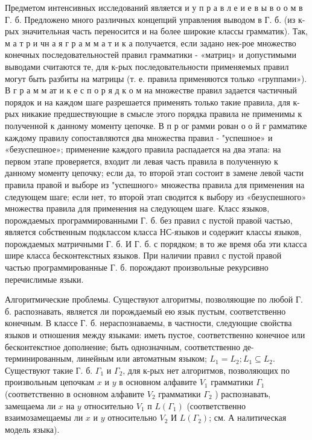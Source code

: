 \documentclass[10pt]{article}
\begin{document}
Предметом интенсивных исследований является и у п р а в л е и е в ы в о о м в Г. б. Предложено много различных концепций управления выводом в Г. б. (из к-рых значительная часть переносится и на более широкие классы грамматик). Так, м а т р и чн а я г р а м м а т и к а получается, если задано нек-рое множество конечных последовательностей правил грамматики - «матриц» и допустимыми выводами считаются те, для к-рых последовательности применяемых правил могут быть разбиты на матрицы (т. е. правила применяются только «группами»). В г р а м м ат и к е с п о р я д к о м на множестве правил задается частичный порядок и на каждом шаге разрешается применять только такие правила, для к-рых никакие предшествующие в смысле этого порядка правила не применимы к полученной к данному моменту цепочке. В п р ог рамми рован о о й г рамматике каждому правилу сопоставляются два множества правил - "успешное» и «безуспешное»; применение каждого правила распадается на два этапа: на первом этапе проверяется, входит ли левая часть правила в полученную к данному моменту цепочку; если да, то второй этап состоит в замене левой части правила правой и выборе из "успешного» множества правила для применения на следующем шаге; если нет, то второй этап сводится к выбору из «безуспешного» множества правила для применения на следующем шаге. Класс языков, порождаемых программированными Г. б. без правил с пустой правой частью, является собственным подклассом класса НС-языков и содержит классы языков, порождаемых матричными Г. б. И Г. б. с порядком; в то же время оба эти класса шире класса бесконтекстных языков. При наличии правил с пустой правой частью программированные Г. б. порождают произвольные рекурсивно перечислимые языки.



Алгоритмические проблемы. Существуют алгоритмы, позволяющие по любой $Г$. б. распознавать, является ли порождаемый ею язык пустым, соответственно конечным. В классе Г. б. нераспознаваемы, в частности, следующие свойства языков и отношения между языками: иметь пустое, соответственно конечное или бесконтекстное дополнение; быть однозначным, соответственно де- терминированным, линейным или автоматным языком; $L_{1}=L_{2} ; L_{1} \subseteq L_{2}$. Существуют такие Г. б. $\Gamma_{1}$ и $\Gamma_{2}$, для к-рых нет алгоритмов, позволяющих по произвольным цепочкам $x$ и $y$ в основном алфавите $V_{1}$ грамматики $\Gamma_{1}$ (соответственно в основном алфавите $V_{2}$ грамматики $\Gamma_{2}$ ) распознавать, замещаема ли $x$ на $y$ относительно $V_{1}$ п $L\left(\Gamma_{1}\right)$ (соответственно взаимозамещаемы ли $x$ и $y$ относительно $V_{2}$ И $L\left(\Gamma_{2}\right)$; см. А налитическая модель языка).
\end{document}
